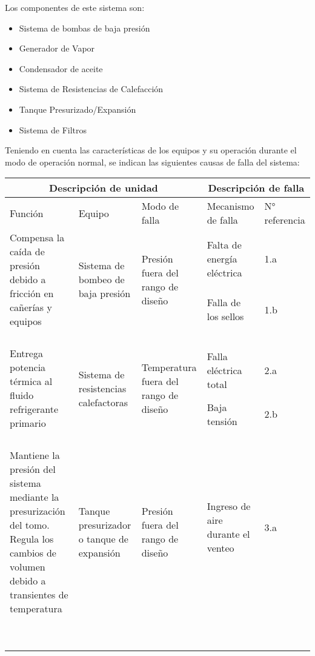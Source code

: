 \documentclass{article}
\begin{document}
Los componentes de este sistema son:
\begin{itemize}
    \item Sistema de bombas de baja presión
    \item Generador de Vapor
    \item Condensador de aceite
    \item Sistema de Resistencias de Calefacción
    \item Tanque Presurizado/Expansión
    \item Sistema de Filtros
\end{itemize}
Teniendo  en  cuenta  las  características  de  los  equipos  y  su  operación durante el modo de operación normal, se indican las siguientes causas de falla del sistema:
\begin{table}[H]
\centering
\begin{tabularx}{\textwidth}{XXXXX}
\toprule
\multicolumn{3}{c}{Descripción de unidad} & \multicolumn{2}{c}{Descripción de falla} \\
\midrule
Función & Equipo & Modo de falla & Mecanismo de \newline falla & N° referencia 
\\
\midrule
\multirow{2}{7em}{Compensa la caída de presión debido a fricción en cañerías y equipos} & \multirow{2}{7em}{Sistema de bombeo de baja presión} & \multirow{2}{7em}{Presión fuera del rango de diseño} & Falta de energía eléctrica & 1.a \\
 & & & Falla de los sellos &  1.b \\ \\ \\ \\ \\
\multirow{2}{7em}{Entrega potencia térmica al fluido refrigerante primario} & \multirow{2}{7em}{Sistema de resistencias calefactoras} & \multirow{2}{7em}{Temperatura fuera del rango de diseño} & Falla eléctrica \newline total & 2.a \\
& & & Baja tensión &  2.b \\ \\ \\ \\ \\
\multirow{2}{7em}{Mantiene la presión del sistema mediante la presurización del tomo. Regula los cambios de volumen debido a transientes de temperatura} & \multirow{2}{7em}{Tanque presurizador o tanque de expansión} & \multirow{2}{7em}{Presión fuera del rango de diseño} & Ingreso de aire \newline durante el venteo & 3.a \\ \\ \\ \\ \\ \\ \\ \\ \\ \\ \\

\end{tabularx}
\end{table}
\end{document}
